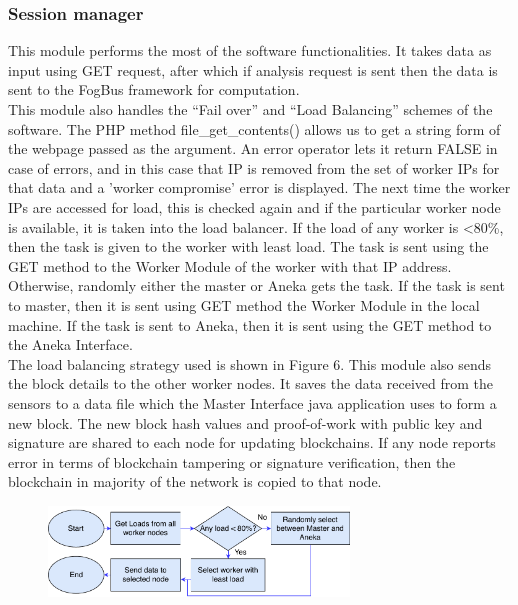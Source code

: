\documentclass[10pt,journal,compsoc]{IEEEtran}
\begin{document}
\subsubsection{Session manager}
This module performs the most of the software functionalities. It takes data as input using GET request, after which if analysis request is sent then the data is sent to the FogBus framework for computation. \\
This module also handles the “Fail over” and “Load Balancing” schemes of the software. The PHP method file\_get\_contents() allows us to get a string form of the webpage passed as the argument. An error operator lets it return FALSE in case of errors, and in this case that IP is removed from the set of worker IPs for that data and a 'worker compromise' error is displayed. The next time the worker IPs are accessed for load, this is checked again and if the particular worker node is available, it is taken into the load balancer. If the load of any worker is \textless 80\%, then the task is given to the worker with least load. The task is sent using the GET method to the Worker Module of the worker with that IP address. Otherwise, randomly either the master or Aneka gets the task. If the task is sent to master, then it is sent using GET method the Worker Module in the local machine. If the task is sent to Aneka, then it is sent using the GET method to the Aneka Interface. \\
The load balancing strategy used is shown in Figure 6.
This module also sends the block details to the other worker nodes. It saves the data received from the sensors to a data file which the Master Interface java application uses to form a new block. The new block hash values and proof-of-work with public key and signature are shared to each node for updating blockchains. If any node reports error in terms of blockchain tampering or signature verification, then the blockchain in majority of the network is copied to that node.
\begin{figure}[H]
\centering
\includegraphics[width=8cm]{load-balancing}
\end{figure}
\end{document}
